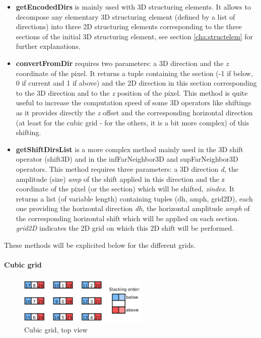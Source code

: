 \documentclass[a4paper,10pt,oneside]{article}
\begin{document}
\begin{itemize}
\item \textbf{getEncodedDirs} is mainly used with 3D structuring elements. It allows to
decompose any elementary 3D structuring element (defined by a list of directions) into
three 2D structuring elements corresponding to the three sections of the initial 3D structuring
element, see section \ref{cha:structelem} for further explanations.
\item \textbf{convertFromDir} requires two parameters: a 3D direction and the \emph{z} coordinate
of the pixel. It returns a tuple containing the section (-1 if below, 0 if current and 1 if above)
and the 2D direction in this section corresponding to the 3D direction and to the \emph{z} position of the
pixel. This method is quite useful to increase the computation speed of some 3D operators like shiftings as it
provides directly the \emph{z} offset and the corresponding horizontal direction (at least for the cubic
grid - for the others, it is a bit more complex) of this shifting.
\item \textbf{getShiftDirsList} is a more complex method mainly used in the 3D shift operator (shift3D) and
in the infFarNeighbor3D and supFarNeighbor3D operators. This method requires three parameters: a 3D
direction \emph{d}, the amplitude (size) \emph{amp} of the shift applied in this direction and the
z coordinate of the pixel (or the section) which will be shifted, \emph{zindex}. It returns
a list (of variable length) containing tuples (dh, amph, grid2D), each one providing the horizontal
direction \emph{dh}, the horizontal amplitude \emph{amph} of the corresponding horizontal shift which
will be applied on each section. \emph{grid2D} indicates the 2D grid on which this 2D shift will be performed.
\end{itemize}

These methods will be explicited below for the different grids.

\paragraph{Cubic grid\\}

\begin{figure}
\centering
\includegraphics[width=0.55\textwidth]{figures/cubic_grid.pdf}
\caption{Cubic grid, top view}
\label{fig:cubic_grid}
\end{figure}
\end{document}
